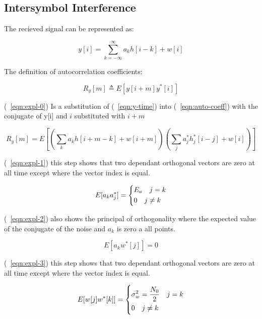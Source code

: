 \subsection{Intersymbol Interference}

The recieved signal can be represented as:

\begin{equation}
    \label{eqn:y-time}
    y[i] = \sum_{k=-\infty}^\infty a_k h[i-k] + w[i]
\end{equation}

The definition of autocorrelation coefficients:

\begin{equation}
    \label{eqn:auto-coeff}
    R_y[m] \triangleq E[y[i+m]y^*[i]]
\end{equation}

(~\ref{eqn:expl-0}) Is a substitution of (~\ref{eqn:y-time}) into (~\ref{eqn:auto-coeff}) with the conjugate of y[i] and
$i$ substituted with $i+m$

\begin{equation}
    \label{eqn:expl-0}
    R_y[m] = E[(\sum_{k}a_kh[i+m-k]+w[i+m])(\sum_j a_j^* h_j^*[i-j]+w[i])]
\end{equation}

(~\ref{eqn:expl-1}) this step shows that two dependant orthogonal vectors are zero at all time except where the vector index is equal.

\begin{equation}
    \label{eqn:expl-1}
    E[a_k a_j^*] =
    \begin{dcases}
        E_a \quad j=k \\
        0 \quad j \neq k
    \end{dcases}
\end{equation}

(~\ref{eqn:expl-2}) also shows the principal of orthogonality where the expected value of the conjugate of the noise and $a_k$ is
zero a all points.

\begin{equation}
    \label{eqn:expl-2}
    E[a_k w^*[j]] = 0
\end{equation}

(~\ref{eqn:expl-3}) this step shows that two dependant orthogonal vectors are zero at all time except where the vector index is equal.

\begin{equation}
    \label{eqn:expl-3}
    E[w[j]w^*[k]] =
    \begin{dcases}
        \sigma_w^2 = \frac{N_0}{2} \quad j=k \\
        0 \quad j \neq k
    \end{dcases}
\end{equation}

